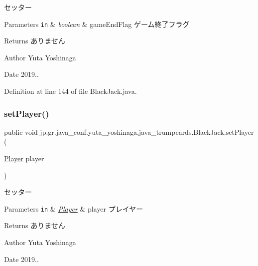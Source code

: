 セッター 


\begin{DoxyParams}[1]{Parameters}
\mbox{\tt in}  & {\em boolean} & game\+End\+Flag ゲーム終了フラグ \\
\hline
\end{DoxyParams}
\begin{DoxyReturn}{Returns}
ありません 
\end{DoxyReturn}
\begin{DoxyAuthor}{Author}
Yuta Yoshinaga 
\end{DoxyAuthor}
\begin{DoxyDate}{Date}
2019.. 
\end{DoxyDate}


Definition at line 144 of file Black\+Jack.\+java.

\mbox{\label{classjp_1_1gr_1_1java__conf_1_1yuta__yoshinaga_1_1java__trumpcards_1_1_black_jack_a3c6bfcfb81ccad65be2f5cfb82819951}} 
\subsubsection{\texorpdfstring{set\+Player()}{setPlayer()}}
{\footnotesize\ttfamily public void jp.\+gr.\+java\+\_\+conf.\+yuta\+\_\+yoshinaga.\+java\+\_\+trumpcards.\+Black\+Jack.\+set\+Player (\begin{DoxyParamCaption}\item[{\hyperlink{classjp_1_1gr_1_1java__conf_1_1yuta__yoshinaga_1_1java__trumpcards_1_1_player}{Player}}]{player }\end{DoxyParamCaption})}



セッター 


\begin{DoxyParams}[1]{Parameters}
\mbox{\tt in}  & {\em \hyperlink{classjp_1_1gr_1_1java__conf_1_1yuta__yoshinaga_1_1java__trumpcards_1_1_player}{Player}} & player プレイヤー \\
\hline
\end{DoxyParams}
\begin{DoxyReturn}{Returns}
ありません 
\end{DoxyReturn}
\begin{DoxyAuthor}{Author}
Yuta Yoshinaga 
\end{DoxyAuthor}
\begin{DoxyDate}{Date}
2019.. 
\end{DoxyDate}


